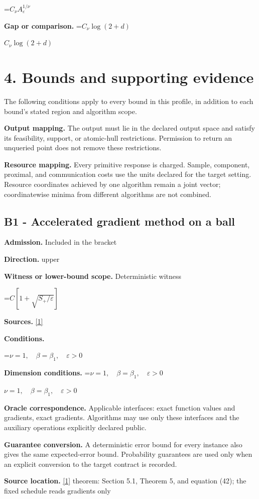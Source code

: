 \documentclass[10pt,a4paper]{article}
\newcommand{\AtlasMath}[1]{\par\begingroup\centering\setbox0=\hbox{$\displaystyle #1$}\ifdim\wd0>1.4\linewidth\typeout{ATLAS WIDE FORMULA: \the\wd0}\fi\ifdim\wd0>\linewidth\resizebox{\linewidth}{!}{\box0}\else\box0\fi\par\endgroup}
\newcommand{\AtlasInlineMath}[1]{\begingroup\setbox0=\hbox{$#1$}\ifdim\wd0>.4\linewidth\endgroup\AtlasMath{#1}\else\endgroup$#1$\fi}
\begin{document}
\AtlasMath{C_\nu A_\varepsilon^{1/\nu}}
\textbf{Gap or comparison.} \AtlasInlineMath{C_\nu\log(2+d)}

\section{4. Bounds and supporting evidence}
The following conditions apply to every bound in this profile, in addition to each bound's stated region and algorithm scope.

\textbf{Output mapping.} The output must lie in the declared output space and satisfy its feasibility, support, or atomic-hull restrictions. Permission to return an unqueried point does not remove these restrictions.

\textbf{Resource mapping.} Every primitive response is charged. Sample, component, proximal, and communication costs use the units declared for the target setting. Resource coordinates achieved by one algorithm remain a joint vector; coordinatewise minima from different algorithms are not combined.

\subsection{B1 - Accelerated gradient method on a ball}
\textbf{Admission.} Included in the bracket

\textbf{Direction.} upper

\textbf{Witness or lower-bound scope.} Deterministic witness

\AtlasMath{C[1+\sqrt{S_+/\varepsilon}]}
\textbf{Sources.} \href{https://optimization-online.org/wp-content/uploads/2010/12/2865.pdf}{[1]}

\textbf{Conditions.} 
\AtlasMath{\nu=1,\quad\beta=\beta_1,\quad\varepsilon>0}


\textbf{Dimension conditions.} \AtlasInlineMath{\nu=1,\quad\beta=\beta_1,\quad\varepsilon>0}

\textbf{Oracle correspondence.} Applicable interfaces: exact function values and gradients, exact gradients. Algorithms may use only these interfaces and the auxiliary operations explicitly declared public.

\textbf{Guarantee conversion.} A deterministic error bound for every instance also gives the same expected-error bound. Probability guarantees are used only when an explicit conversion to the target contract is recorded.

\textbf{Source location.} \href{https://optimization-online.org/wp-content/uploads/2010/12/2865.pdf}{[1]} theorem: Section 5.1, Theorem 5, and equation (42); the fixed schedule reads gradients only
\end{document}
